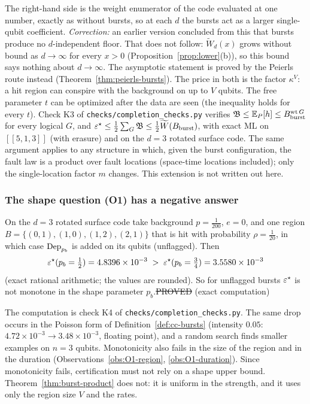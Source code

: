 \noindent The right-hand side is the weight enumerator of the code evaluated at one number, exactly as without bursts, so at each $d$ the bursts act as a larger single-qubit coefficient. \emph{Correction:} an earlier version concluded from this that bursts produce no $d$-independent floor. That does not follow: $\widetilde W_d(x)$ grows without bound as $d\to\infty$ for every $x>0$ (Proposition~\ref{prop:lower}(b)), so this bound says nothing about $d\to\infty$. The asymptotic statement is proved by the Peierls route instead (Theorem~\ref{thm:peierls-bursts}). The price in both is the factor $\kappa^V$: a hit region can conspire with the background on up to $V$ qubits.
The free parameter $t$ can be optimized after the data are seen (the inequality holds for every $t$). Check K3 of \texttt{checks/completion\_checks.py} verifies $\mathfrak{B}\le\mathbb{E}_P[h]\le B_{\rm burst}^{\operatorname{wt} G}$ for every logical $G$, and $\varepsilon^{\star}\le\tfrac12\sum_G\mathfrak{B}\le\tfrac12\widetilde W(B_{\rm burst})$, with exact ML on $[[5,1,3]]$ (with erasure) and on the $d=3$ rotated surface code.
The same argument applies to any structure in which, given the burst configuration, the fault law is a product over fault locations (space-time locations included); only the single-location factor $m$ changes. This extension is not written out here.

\subsubsection*{The shape question (O1) has a negative answer}

\begin{proposition}\label{prob:O1}
On the $d=3$ rotated surface code take background $p=\tfrac1{200}$, $e=0$, and one region $B=\{(0,1),(1,0),(1,2),(2,1)\}$ that is hit with probability $\rho=\tfrac1{20}$, in which case $\mathrm{Dep}_{p_b}$ is added on its qubits (unflagged). Then
\[
\varepsilon^{\star}(p_b=\tfrac12)=4.8396\times10^{-3}\;>\;\varepsilon^{\star}(p_b=\tfrac34)=3.5580\times10^{-3}
\]
(exact rational arithmetic; the values are rounded). So for unflagged bursts $\varepsilon^{\star}$ is not monotone in the shape parameter $p_b$.\hfill\st{PROVED} (exact computation)
\end{proposition}
\noindent The computation is check K4 of \texttt{checks/completion\_checks.py}. The same drop occurs in the Poisson form of Definition~\ref{def:cc-bursts} (intensity $0.05$: $4.72\times10^{-3}\to3.48\times10^{-3}$, floating point), and a random search finds smaller examples on $n=3$ qubits.
Monotonicity also fails in the size of the region and in the duration (Observations~\ref{obs:O1-region}, \ref{obs:O1-duration}). Since monotonicity fails, certification must not rely on a shape upper bound. Theorem~\ref{thm:burst-product} does not: it is uniform in the strength, and it uses only the region size $V$ and the rates.

